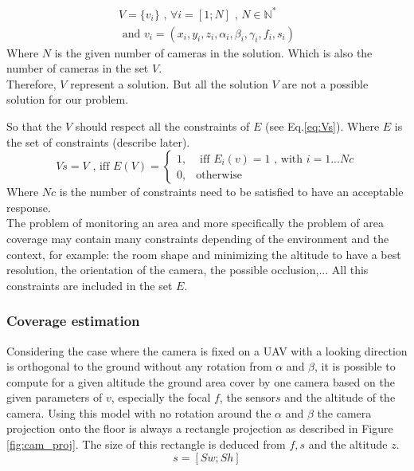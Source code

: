 \begin{equation}
\begin{split}
V= \{v_i\} \mbox{  , } \forall i=[1;N] \mbox{ , } N\in \mathbb{N}^*
\\
\mbox{ and } v_i= (x_i,y_i,z_i,\alpha_i ,\beta_i,\gamma_i,f_i,s_i)
\end{split}
\end{equation}
\noindent Where $N$ is the given number of cameras in the solution. Which is also the number of cameras in the set $V$. \\
Therefore, $V$ represent a solution. But all the solution $V$ are not a possible solution for our problem. 

So that the $V$ should respect all the constraints of $E$ (see Eq.\ref{eq:Vs}). Where $E$ is the set of constraints (describe later).
\begin{equation}
Vs=V \mbox{ , iff } E(V)=\begin{cases}1, & \mbox{  iff } E_i(v)=1 \mbox{ , with } i=1...Nc \\ 0, & \mbox{otherwise} 
\end{cases} 
\end{equation}
Where $Nc$ is the number of constraints need to be satisfied to have an acceptable response.\\
The problem of monitoring an area and more specifically the problem of area coverage may contain many constraints depending of the environment and the context, for example: the room shape and minimizing the altitude to have a best resolution, the orientation of the camera, the possible occlusion,... All this constraints are included in the set $E$. \\

\subsubsection{Coverage estimation} \label{sec:coverageEstimation}
Considering the case where the camera is fixed on a UAV with a looking direction is orthogonal to the ground without any rotation from $\alpha$ and $\beta$, it is  possible to compute for a given altitude the ground area cover by one camera based on the given parameters of $v$, especially the focal $f$, the sensor$s$ and the altitude of the camera. Using this model with no rotation around the $\alpha$ and $\beta$ the camera projection onto the floor is always a rectangle projection as described in Figure \ref{fig:cam_proj}. The size of this rectangle is deduced from $ f ,s$ and the altitude $z$. 
\begin{equation}
s= [Sw ; Sh]  %
\end{equation}

